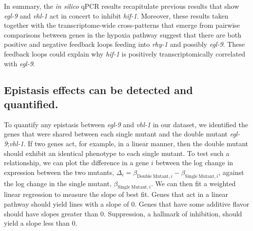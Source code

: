 \documentclass[9pt,twocolumn,twoside]{pnas-new}
\newcommand{\egl}{\emph{egl-9}}
\newcommand{\rhy}{\emph{rhy-1}}
\newcommand{\vhl}{\emph{vhl-1}}
\newcommand{\hif}{\emph{hif-1}}
\newcommand{\hifp}{HIF-1}
\begin{document}


In summary, the \emph{in silico} qPCR results recapitulate previous results that show \egl{} and \vhl{} act in concert to inhibit \hif{}. Moreover, these results taken together with the transcriptome-wide cross-patterns that emerge from pairwise comparisons between genes in the hypoxia pathway suggest that there are both positive and negative feedback loops feeding into \rhy{} and possibly \egl{}. These feedback loops could explain why \hif{} is positively transcriptomically correlated with \egl{}.

\subsection{Epistasis effects can be detected and quantified.}
\label{sub:Epistasis}
To quantify any epistasis between \egl{} and \vhl{} in our dataset, we identified the genes that were shared between each single mutant and the double mutant \egl{};\vhl{}. If two genes act, for example, in a linear manner, then the double mutant should exhibit an identical phenotype to each single mutant. To test such a relationship, we can plot the difference in a gene $i$ between the log change in expression between the two mutants, $\Delta_i = \beta_{\mathrm{Double~Mutant}, i} - \beta_{\mathrm{Single~Mutant}, i}$, against the log change in the single mutant,  $\beta_{\mathrm{Single~Mutant}, i}$. We can then fit a weighted linear regression to measure the slope of best fit. Genes that act in a linear pathway should yield lines with a slope of 0. Genes that have some additive flavor should have slopes greater than 0. Suppression, a hallmark of inhibition, should yield a slope less than 0.
\end{document}
